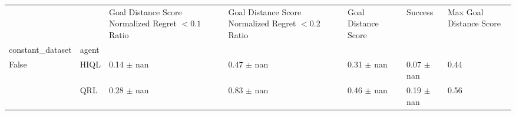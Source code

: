 \begin{tabular}{lllllll}
\toprule
 &  & Goal Distance Score Normalized Regret $< 0.1$ Ratio & Goal Distance Score Normalized Regret $< 0.2$ Ratio & Goal Distance Score & Success & Max Goal Distance Score \\
constant_dataset & agent &  &  &  &  &  \\
\midrule
\multirow[t]{2}{*}{False} & HIQL & 0.14 $\pm$ nan & 0.47 $\pm$ nan & 0.31 $\pm$ nan & 0.07 $\pm$ nan & 0.44 \\
 & QRL & 0.28 $\pm$ nan & 0.83 $\pm$ nan & 0.46 $\pm$ nan & 0.19 $\pm$ nan & 0.56 \\
\cline{1-7}
\bottomrule
\end{tabular}
